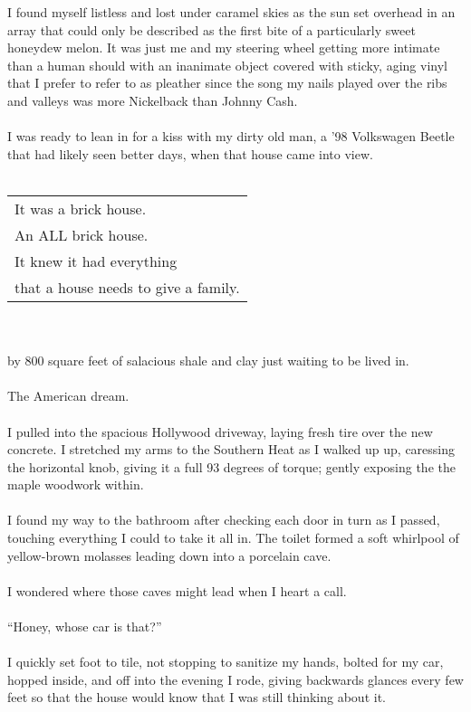 \documentclass{article}
\begin{document}
I found myself listless and lost under caramel skies as the sun set overhead
in an array that could only be described as the first bite of a
particularly sweet honeydew melon.
It was just me and my steering wheel getting more intimate than
a human should with an inanimate object covered with sticky, aging
vinyl that I prefer to refer to as pleather since the song my
nails played over the ribs and valleys was more Nickelback than
Johnny Cash.
\\
\\
I was ready to lean in for a kiss with my dirty old man,
a '98 Volkswagen Beetle that had likely seen better days,
when that house came into view.
\\ \\
\noindent
\begin{tabular}{l}
It was a brick house. \\
An ALL brick house. \\
It knew it had everything \\
that a house needs to give a family. \\
\end{tabular}
\\ \\
 by 800 square feet of salacious shale and clay
just waiting to be lived in.
\\
\\
The American dream.
\\
\\
I pulled into the spacious Hollywood driveway,
laying fresh tire over the new concrete.
I stretched my arms to the Southern Heat as I walked up
up, caressing the horizontal knob, giving it a full
93 degrees of torque; gently exposing the the maple
woodwork within.
\\
\\
I found my way to the bathroom after checking each
door in turn as I passed, touching everything I could
to take it all in.  The toilet formed a soft
whirlpool of yellow-brown molasses leading down
into a porcelain cave.
\\
\\
I wondered where those caves might lead
when I heart a call.
\\ \\
\indent ``Honey, whose car is that?'' \\
\\
I quickly set foot to tile, not stopping to sanitize my hands,
bolted for my car, hopped inside, and off into the evening I rode,
giving backwards glances every few feet so that the house
would know that I was still thinking about it.
\end{document}
